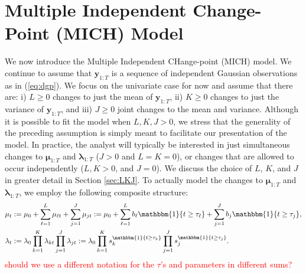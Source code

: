 \section{Multiple Independent Change-Point (MICH) Model}
\label{sec:mich}

We now introduce the Multiple Independent CHange-point (MICH) model. We continue to assume that $\mathbf{y}_{1:T}$ is a sequence of independent Gaussian observations as in (\ref{eq:dgp}). We focus on the univariate case for now and assume that there are: i) $L \geq 0$ changes to just the mean of $\mathbf{y}_{1:T}$, ii) $K \geq 0$ changes to just the variance of $\mathbf{y}_{1:T}$, and iii) $J \geq 0$ joint changes to the mean and variance. Although it is possible to fit the model when $L,K,J>0$, we stress that the generality of the preceding assumption is simply meant to facilitate our presentation of the model. In practice, the analyst will typically be interested in just simultaneous changes to $\boldsymbol{\mu}_{1:T}$ and $\boldsymbol{\lambda}_{1:T}$ ($J>0$ and $L=K=0$), or changes that are allowed to occur independently ($L,K>0$, and $J=0$). We discuss the choice of $L$, $K$, and $J$ in greater detail in Section \ref{sec:LKJ}. To actually model the changes to $\boldsymbol{\mu}_{1:T}$ and $\boldsymbol{\lambda}_{1:T}$, we employ the following composite structure:
\begin{align}
    \mu_{t} &:= \mu_0 + \sum_{\ell = 1}^L \mu_{\ell t} + \sum_{j = 1}^J \mu_{jt} := \mu_0 + \sum_{\ell = 1}^L b_\ell\mathbbm{1}\{t\geq\tau_\ell\} + \sum_{j = 1}^J b_j\mathbbm{1}\{t\geq\tau_j\}, \label{eq:mu_t}\\
    \lambda_t &:= \lambda_0\prod_{k=1}^K \lambda_{kt}\prod_{j=1}^J \lambda_{jt} := \lambda_0\prod_{k=1}^K s_k^{\mathbbm{1}\{t\geq\tau_k\}}\prod_{j=1}^J s_j^{\mathbbm{1}\{t\geq\tau_j\}}. \label{eq:lambda_t}
\end{align}
\textcolor{red}{should we use a different notation for the $\tau$'s and parameters in different sums?} 
